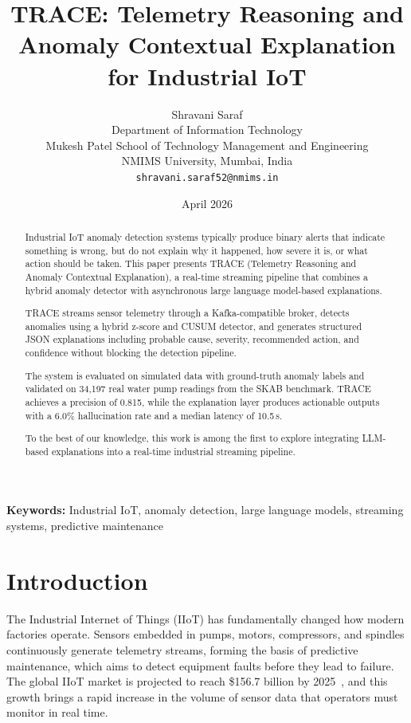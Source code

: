 \documentclass[11pt, a4paper]{article}
\title{TRACE: Telemetry Reasoning and Anomaly Contextual Explanation for Industrial IoT}
\author{Shravani Saraf\\[4pt]
\small Department of Information Technology\\
\small Mukesh Patel School of Technology Management and Engineering\\
\small NMIMS University, Mumbai, India\\[2pt]
\small \texttt{shravani.saraf52@nmims.in}}
\date{April 2026}
\begin{document}
\maketitle


\begin{abstract}
Industrial IoT anomaly detection systems typically produce binary alerts that indicate something is wrong, but do not explain why it happened, how severe it is, or what action should be taken. This paper presents TRACE (Telemetry Reasoning and Anomaly Contextual Explanation), a real-time streaming pipeline that combines a hybrid anomaly detector with asynchronous large language model-based explanations.

TRACE streams sensor telemetry through a Kafka-compatible broker, detects anomalies using a hybrid z-score and CUSUM detector, and generates structured JSON explanations including probable cause, severity, recommended action, and confidence without blocking the detection pipeline.

The system is evaluated on simulated data with ground-truth anomaly labels and validated on 34,197 real water pump readings from the SKAB benchmark. TRACE achieves a precision of 0.815, while the explanation layer produces actionable outputs with a 6.0\% hallucination rate and a median latency of 10.5\,s.

To the best of our knowledge, this work is among the first to explore integrating LLM-based explanations into a real-time industrial streaming pipeline.
\end{abstract}

\vspace{0.5em}
\noindent\textbf{Keywords:} Industrial IoT, anomaly detection, large language models, streaming systems, predictive maintenance

\newpage



\section{Introduction}

The Industrial Internet of Things (IIoT) has fundamentally changed how 
modern factories operate. Sensors embedded in pumps, motors, compressors, 
and spindles continuously generate telemetry streams, forming the basis 
of predictive maintenance, which aims to detect equipment faults before 
they lead to failure. The global IIoT market is projected to reach 
\$156.7 billion by 2025~\cite{al2020iot}, and this growth brings a rapid 
increase in the volume of sensor data that operators must monitor in 
real time.
\end{document}
